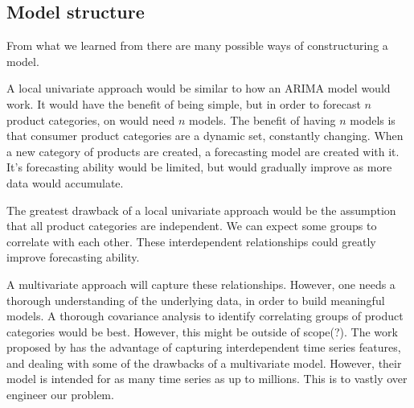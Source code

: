 \subsection{Model structure}



From what we learned from 
there are many possible ways of constructuring a model.

A local univariate approach would be similar to how an ARIMA model would work.
It would have the benefit of being simple, but in order to forecast $n$ product categories,
on would need $n$ models.
The benefit of having $n$ models is that consumer product categories are a dynamic set, constantly changing.
When a new category of products are created, a forecasting model are created with it. It's forecasting ability
would be limited, but would gradually improve as more data would accumulate.

The greatest drawback of a local univariate approach would be the assumption that all product categories
are independent. We can expect some groups to correlate with each other. These interdependent relationships
could greatly improve forecasting ability.

A multivariate approach will capture these relationships.
However, one needs a thorough understanding of the underlying data, in order to build meaningful models.
A thorough covariance analysis to identify correlating groups of product categories would be best.
However, this might be outside of scope(?).
The work proposed by \cite{Sen2019} has the advantage of capturing interdependent time series features, and dealing with
some of the drawbacks of a multivariate model. However, their model is intended for as many time series as up to millions.
This is to vastly over engineer our problem.

